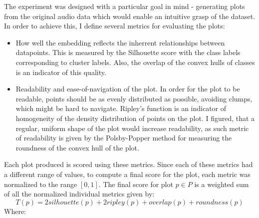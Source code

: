\documentclass[11pt]{article}
\begin{document}
The experiment was designed with a particular goal in mind - generating plots from the original audio data which would enable an intuitive grasp of the dataset. In order to achieve this, I define several metrics for evaluating the plots:
\begin{itemize}
\item How well the embedding reflects the inherrent relationships between datapoints. This is measured by the Silhouette score with the class labels corresponding to cluster labels. Also, the overlap of the convex hulls of classes is an indicator of this quality.
\item Readability and ease-of-navigation of the plot. In order for the plot to be readable, points should be as evenly distributed as possible, avoiding clumps, which might be hard to navigate. Ripley's function is an indicator of homogeneity of the density distribution of points on the plot. I figured, that a regular, uniform shape of the plot would increase readability, as such metric of readability is given by the Polsby-Popper method for measuring the roundness of the convex hull of the plot.
\end{itemize}
Each plot produced is scored using these metrics. Since each of these metrics had a different range of values, to compute a final score for the plot, each metric was normalized to the range \([0, 1]\). The final score for plot \(p \in P\) is a weighted sum of all the normalized individual metrics given by:
\[T(p) = 2silhouette(p) + 2ripley(p) + overlap(p) + roundness(p) \]
Where:
\end{document}
